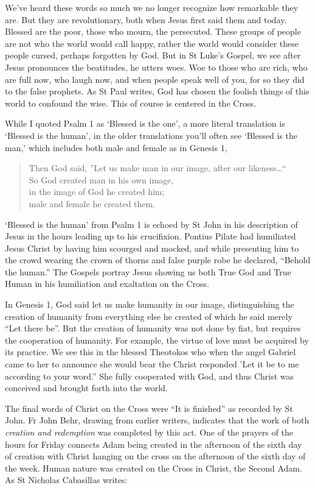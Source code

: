 \documentclass[
]{article}
\newcommand{\RL}[1]{\beginR #1\endR}
\begin{document}
We've heard these words so much we no longer recognize how remarkable
they are. But they are revolutionary, both when Jesus first said them
and today. Blessed are the poor, those who mourn, the persecuted. These
groups of people are not who the world would call happy, rather the
world would consider these people cursed, perhaps forgotten by God. But
in St Luke's Gospel, we see after Jesus pronounces the beatitudes, he
utters woes. Woe to those who are rich, who are full now, who laugh now,
and when people speak well of you, for so they did to the false
prophets. As St Paul writes, God has chosen the foolish things of this
world to confound the wise. This of course is centered in the Cross.

While I quoted Psalm 1 as `Blessed is the one', a more literal
translation is `Blessed is the human', in the older translations you'll
often see `Blessed is the man,' which includes both male and female as
in Genesis 1,

\begin{quote}
Then God said, \RL{''}Let us make man in our image, after our
likeness\ldots``\\
So God created man in his own image,\\
in the image of God he created him;\\
male and female he created them.
\end{quote}

`Blessed is the human' from Psalm 1 is echoed by St John in his
description of Jesus in the hours leading up to his crucifixion. Pontius
Pilate had humiliated Jesus Christ by having him scourged and mocked,
and while presenting him to the crowd wearing the crown of thorns and
false purple robe he declared, ``Behold the human.'' The Gospels portray
Jesus showing us both True God and True Human in his humiliation and
exaltation on the Cross.

In Genesis 1, God said let us make humanity in our image, distinguishing
the creation of humanity from everything else he created of which he
said merely ``Let there be''. But the creation of humanity was not done
by fiat, but requires the cooperation of humanity. For example, the
virtue of love must be acquired by its practice. We see this in the
blessed Theotokos who when the angel Gabriel came to her to announce she
would bear the Christ responded 'Let it be to me according to your
word.'' She fully cooperated with God, and thus Christ was conceived and
brought forth into the world.

The final words of Christ on the Cross were ``It is finished'' as
recorded by St John. Fr John Behr, drawing from earlier writers,
indicates that the work of both \emph{creation and redemption} was
completed by this act. One of the prayers of the hours for Friday
connects Adam being created in the afternoon of the sixth day of
creation with Christ hanging on the cross on the afternoon of the sixth
day of the week. Human nature was created on the Cross in Christ, the
Second Adam. As St Nicholas Cabasillas writes:
\end{document}
